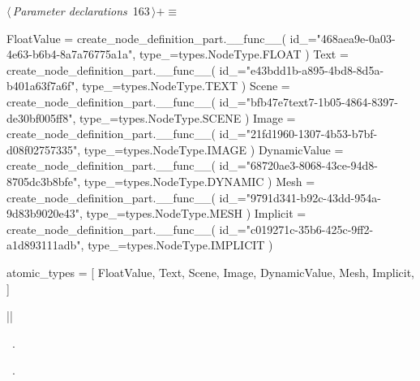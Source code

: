 \documentclass[%
    a4paper,    %
    justified,  %
    nobib,      %
    openany     %
]{tufte-book}
\begin{document}
\begin{flushleft} \small
\begin{minipage}{\linewidth}\label{scrap180}\raggedright\small
{} $\langle\,${\itshape Parameter declarations}\nobreak\ {\footnotesize {163}}$\,\rangle+\equiv$
\vspace{-1ex}
\begin{pythoncode}
    FloatValue = create_node_definition_part.__func__(
        id_="468aea9e-0a03-4e63-b6b4-8a7a76775a1a",
        type_=types.NodeType.FLOAT
    )
    Text = create_node_definition_part.__func__(
        id_="e43bdd1b-a895-4bd8-8d5a-b401a63f7a6f",
        type_=types.NodeType.TEXT
    )
    Scene = create_node_definition_part.__func__(
        id_="bfb47e7text7-1b05-4864-8397-de30bf005ff8",
        type_=types.NodeType.SCENE
    )
    Image = create_node_definition_part.__func__(
        id_="21fd1960-1307-4b53-b7bf-d08f02757335",
        type_=types.NodeType.IMAGE
    )
    DynamicValue = create_node_definition_part.__func__(
        id_="68720ae3-8068-43ce-94d8-8705dc3b8bfe",
        type_=types.NodeType.DYNAMIC
    )
    Mesh = create_node_definition_part.__func__(
        id_="9791d341-b92c-43dd-954a-9d83b9020e43",
        type_=types.NodeType.MESH
    )
    Implicit = create_node_definition_part.__func__(
        id_="c019271c-35b6-425c-9ff2-a1d893111adb",
        type_=types.NodeType.IMPLICIT
    )

    atomic_types = [
        FloatValue,
        Text,
        Scene,
        Image,
        DynamicValue,
        Mesh,
        Implicit,
    ]

|\NWsep|
\end{pythoncode}
\vspace{1.5ex}
\footnotesize
\begin{list}{}{\setlength{\itemsep}{-\parsep}\setlength{\itemindent}{-\leftmargin}}
\item \NWtxtMacroDefBy\ .
\item \NWtxtMacroRefIn\ .

\item{}
\end{list}
\end{minipage}\vspace{4ex}
\end{flushleft}
\end{document}
